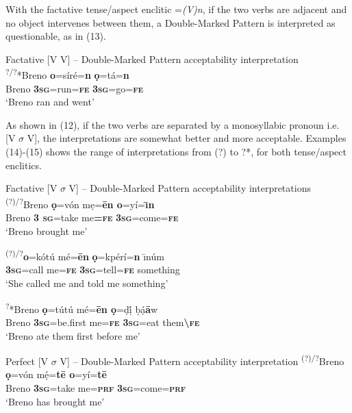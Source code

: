 \documentclass[output=paper]{langsci/langscibook}
\begin{document}
With the factative tense/aspect enclitic =\textit{(V)n}, if the two verbs are adjacent and no object intervenes between them, a Double-Marked Pattern is interpreted as questionable, as in (13). 

\ea
{Factative [V V] – Double-Marked Pattern acceptability interpretation}\\
\gll  \textsuperscript{?/?}*Breno   \textbf{o}=síré=\textbf{n}     \textbf{ọ}=tá=\textbf{n}\\
     Breno  \textbf{\textsc{3sg}}=run=\textbf{\textsc{fe  }}  \textbf{\textsc{3sg}}=go=\textbf{\textsc{fe}}\\
\glt ‘Breno ran and went’
\z

As shown in (12), if the two verbs are separated by a monosyllabic pronoun i.e. [V $\sigma $ V], the interpretations are somewhat better and more acceptable. Examples (14){}-(15) shows the range of interpretations from (?) to ?*, for both tense/aspect enclitics.



\ea
{Factative [V $\sigma $ V] – Double-Marked Pattern acceptability interpretations }\\
\gll   \textsuperscript{(?)/?}Breno  \textbf{ọ}=vón  mẹ=\textbf{\=en  o}=yí=\textbf{\={\i}n}\\
         Breno  \textbf{\textsc{3  sg}}=take  me\textbf{=}\textbf{\textsc{fe}} \textbf{\textsc{3sg}}=come=\textbf{\textsc{fe}}\\
\glt ‘Breno brought me’
\z

\ea
\gll   \textsuperscript{(?)/?}\textbf{o}=kótú    mé=\textbf{\=en}   \textbf{ọ}=kpérí=\textbf{n}   \={\i}núm\\
         \textbf{\textsc{3sg}}=call    me=\textbf{\textsc{fe}} \textbf{\textsc{3sg}}=tell=\textbf{\textsc{fe}}  something\\
\glt ‘She called me and told me something’
\z

\ea
\gll   \textsuperscript{?}*Breno   \textbf{ọ}=tútú     mé=\textbf{\={e}n  ọ}=ḍị́   ḅạ́\textbf{\={a}}w\\
         Breno  \textbf{\textsc{3sg}}=be.first  me=\textbf{\textsc{fe   3sg}}=eat  them\textbf{{\textbackslash}}\textbf{\textsc{fe}}\\
\glt ‘Breno ate them first before me’
\z

\ea
{Perfect [V $\sigma $ V] – Double-Marked Pattern acceptability interpretation}
\gll  \textsuperscript{(?)/?}Breno   \textbf{ọ}=vón     mẹ́=\textbf{t\=e     o}=yí=\textbf{t\=e}\\
       Breno   \textbf{\textsc{3sg}}=take   me=\textbf{\textsc{prf}} \textbf{\textsc{3sg}}=come=\textbf{\textsc{prf}}\\
\glt ‘Breno has brought me’ 
\z
\end{document}
